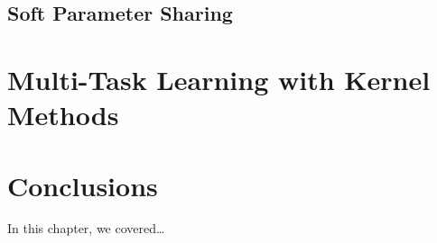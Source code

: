\subsection{Soft Parameter Sharing}





\section{Multi-Task Learning with Kernel Methods} %







\section{Conclusions}\label{sec-conclusions-2}

In this chapter, we covered\dots
